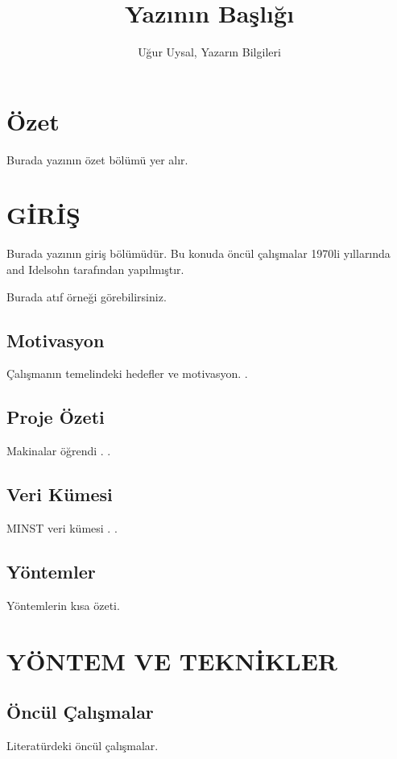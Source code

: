 \documentclass[a4paper, doc, natbib]{apa6}
\title{Yazının Başlığı}
\author{Uğur Uysal, Yazarın Bilgileri}
\affiliation{İTÜ, Yazarın kurumu}
\begin{document}
\begin{titlepage}
    \maketitle
\end{titlepage}


\tableofcontents
\newpage
\listoffigures
\newpage
\listoftables
\newpage
\printglossary[title={Kısaltmalar ve Simgeler Listesi}]
\newpage


\section*{Özet}

Burada yazının özet bölümü yer alır.
\newpage

\section{GİRİŞ}
 Burada yazının giriş bölümüdür.
 Bu konuda öncül çalışmalar 1970li yıllarında \cite{Bajcsy1976ComputerRO} and Idelsohn \citep{terrain_recognition} tarafından yapılmıştır.

Burada atıf örneği görebilirsiniz.

\subsection{Motivasyon}
Çalışmanın temelindeki hedefler ve motivasyon. .

\subsection{Proje Özeti}
Makinalar öğrendi . .
\subsection{Veri Kümesi}
MINST veri kümesi . . 


\subsection{Yöntemler}
Yöntemlerin kısa özeti.

\clearpage
\newpage
\section{YÖNTEM VE TEKNİKLER}

\subsection{Öncül Çalışmalar}
Literatürdeki öncül çalışmalar. 
\end{document}
